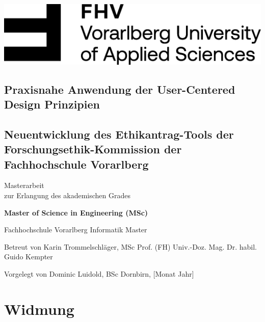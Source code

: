 \documentclass[a4paper,12pt,twoside]{scrreprt}
\begin{document}

\begin{titlepage}
    \begin{flushright}
    \includegraphics[width=0.4\linewidth]{images/FHV_FHV-Logo.png}
    \end{flushright}
    \vspace{1cm}

    \begin{flushleft}
    \section*{Praxisnahe Anwendung der User-Centered Design Prinzipien}
    \subsection*{Neuentwicklung des Ethikantrag-Tools der Forschungsethik-Kommission der Fachhochschule Vorarlberg}
    \vspace{1cm}

    Masterarbeit\\
    zur Erlangung des akademischen Grades
    \vspace{0.5cm}

    \textbf{Master of Science in Engineering (MSc)}

    \vspace{1cm}
    Fachhochschule Vorarlberg\newline
    Informatik Master

    \vspace{0.5cm}

    Betreut von\newline
    Karin Trommelschläger, MSc\newline
    Prof. (FH) Univ.-Doz. Mag. Dr. habil. Guido Kempter

    \vspace{0.5cm}

    Vorgelegt von\newline
    Dominic Luidold, BSc\newline
    Dornbirn, [Monat Jahr]
    \end{flushleft}
\end{titlepage}

\newpage
\section*{Widmung}
\label{sec:widmung}
\end{document}
